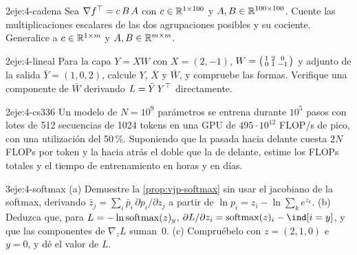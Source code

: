 \begin{ejercicio}{2}{eje:4-cadena}
Sea $\nabla f^{\top}=c\,B\,A$ con $c\in\mathbb{R}^{1\times 100}$ y $A,B\in\mathbb{R}^{100\times 100}$. Cuente las multiplicaciones escalares de las dos agrupaciones posibles y su cociente. Generalice a $c\in\mathbb{R}^{1\times m}$ y $A,B\in\mathbb{R}^{m\times m}$.
\end{ejercicio}

\begin{ejercicio}{2}{eje:4-lineal}
Para la capa $Y=XW$ con $X=(2,-1)$, $W=\begin{psmallmatrix}1&2&0\\0&1&-1\end{psmallmatrix}$ y adjunto de la salida $\bar Y=(1,0,2)$, calcule $Y$, $\bar X$ y $\bar W$, y compruebe las formas. Verifique una componente de $\bar W$ derivando $L=\bar Y\,Y^{\top}$ directamente.
\end{ejercicio}

\begin{ejercicio}{2}{eje:4-cs336}
Un modelo de $N=10^{9}$ parámetros se entrena durante $10^{5}$ pasos con lotes de 512 secuencias de 1024 tokens en una GPU de $495\cdot 10^{12}$ FLOP/s de pico, con una utilización del 50\,\%. Suponiendo que la pasada hacia delante cuesta $2N$ FLOPs por token y la hacia atrás el doble que la de delante, estime los FLOPs totales y el tiempo de entrenamiento en horas y en días.
\end{ejercicio}

\begin{ejercicio}{3}{eje:4-softmax}
(a) Demuestre la \cref{prop:vjp-softmax} sin usar el jacobiano de la softmax, derivando $\bar z_j=\sum_i\bar p_i\,\partial p_i/\partial z_j$ a partir de $\ln p_i=z_i-\ln\sum_ke^{z_k}$. (b) Deduzca que, para $L=-\ln\operatorname{softmax}(z)_y$, $\partial L/\partial z_i=\softmax(z)_i-\ind[i=y]$, y que las componentes de $\nabla_{\!z}L$ suman~0. (c) Compruébelo con $z=(2,1,0)$ e $y=0$, y dé el valor de $L$.
\end{ejercicio}
